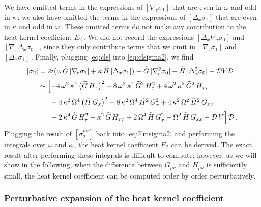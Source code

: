 \documentclass[11pt]{article}
\newcommand{\CD}{\mathcal{D}}
\renewcommand{\tilde}[1]{\widetilde{#1}}
\begin{document}
We have omitted terms in the expressions of $[\nabla_{\!\tau} \sigma_1]$ that are even in $\omega$ and odd in $\kappa$\,; we also have omitted the terms in the expressions of $[\Delta_x \sigma_1]$ that are even in $\kappa$ and odd in $\omega$\,. These omitted terms do not make any contribution to the heat kernel coefficient $E_2$\,. We did not record the expressions $[\Delta_x \! \nabla_{\!\tau} \sigma_0]$ and $[\nabla_{\!\tau} \Delta_x \sigma_0]$\,, since they only contribute terms that we omit in $[\nabla_{\!\tau} \sigma_1]$ and $[\Delta_x \sigma_1]$\,. Finally, plugging \eqref{eq:cls} into \eqref{eq:clsigma2}, we find
%
\begin{align} \label{eq:sigma2result}
\begin{split}
	[\sigma_2] & = 2 i \bigl( \omega \, \tilde{G} \, [\nabla_{\!\tau} \sigma_1] + \kappa \, \tilde{H} \, [\Delta_x \sigma_1] \bigr) + \tilde{G} \, [\nabla_{\!\tau}^2 \sigma_0] + \tilde{H} \, [\Delta_x^2 \sigma_0] - \CD V \CD \\[2pt]
		& \sim \Bigl[ - 4 \, \omega^2 \, \kappa^4 \, \bigl( \tilde{G} \, H_\tau \bigr)^2 - 8 \, \omega^2 \, \kappa^4 \, {\tilde{G}}^2 \, H_\tau^2 + 4 \, \omega^2 \, \kappa^2 \, \tilde{G}^2 \, H_{\tau\tau} \\[2pt]
		& \qquad\!\! - 4 \, \kappa^2 \, \Omega^4 \, \bigl( \tilde{H} \, G_x \bigr)^2 - 8 \, \kappa^2 \, \Omega^4 \, {\tilde{H}}^2 \, G_x^2 + 4 \, \kappa^2 \, \Omega^2 \, {\tilde{H}}^2 \, G_{xx} \\[2pt]
		& \qquad\!\! + 2 \, \kappa^4 \, \tilde{G} \, H_\tau^2 - \kappa^2 \, \tilde{G} \, H_{\tau\tau} + 2 \, \Omega^4 \, \tilde{H} \, G_x^2 - \Omega^2 \, \tilde{H} \, G_{xx} - \CD \, V \Bigr] \, \CD\,.
\end{split}
\end{align}
%
Plugging the result of $[\sigma^{\mu\nu}_2]$ back into \eqref{eq:Emsigma2} and performing the integrals over $\omega$ and $\kappa$\,, the heat kernel coefficient $E_2$ can be derived. The exact result after performing these integrals is difficult to compute; however, as we will show in the following, when the difference between $G_{\mu\nu}$ and $H_{\mu\nu}$ is sufficiently small, the heat kernel coefficient can be computed order by order perturbatively. 


\subsubsection{Perturbative expansion of the heat kernel coefficient} \label{sec:pehkc}
\end{document}

